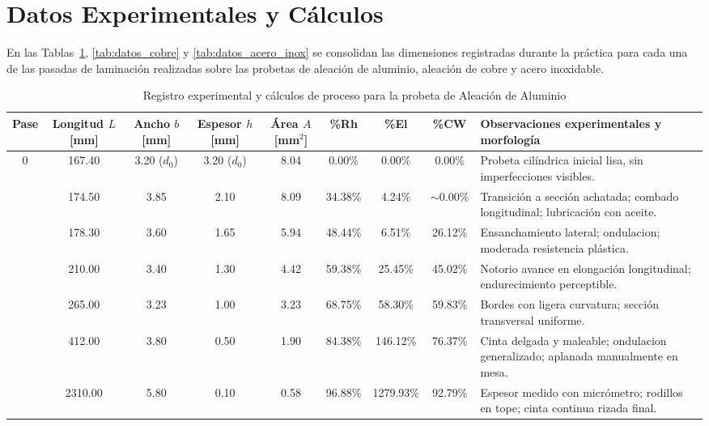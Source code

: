 \documentclass[journal]{IEEEtran}
\begin{document}
\section{Datos Experimentales y Cálculos}
En las Tablas~\ref{tab:datos_aluminio}, \ref{tab:datos_cobre} y \ref{tab:datos_acero_inox} se consolidan las dimensiones registradas durante la práctica para cada una de las pasadas de laminación realizadas sobre las probetas de aleación de aluminio, aleación de cobre y acero inoxidable.

\begin{table}[t]
\centering
\caption{Registro experimental y cálculos de proceso para la probeta de Aleación de Aluminio}
\label{tab:datos_aluminio}
\footnotesize
\setlength{\tabcolsep}{3.5pt}
\renewcommand{\arraystretch}{1.15}
\begin{tabularx}{\textwidth}{c c c c c c c c >{\raggedright\arraybackslash}X}
\toprule
\textbf{Pase} & \makecell{\textbf{Longitud}\\\textbf{$L$ [mm]}} & \makecell{\textbf{Ancho}\\\textbf{$b$ [mm]}} & \makecell{\textbf{Espesor}\\\textbf{$h$ [mm]}} & \makecell{\textbf{Área}\\\textbf{$A$ [mm$^2$]}} & \textbf{\%Rh} & \textbf{\%El} & \textbf{\%CW} & \textbf{Observaciones experimentales y morfología} \\
\midrule
0 & 167.40 & 3.20 ($d_0$) & 3.20 ($d_0$) & 8.04 & 0.00\% & 0.00\% & 0.00\% & Probeta cilíndrica inicial lisa, sin imperfecciones visibles. \\ \addlinespace[3.5pt]
1 & 174.50 & 3.85 & 2.10 & 8.09 & 34.38\% & 4.24\% & $\sim 0.00\%$ & Transición a sección achatada; combado longitudinal; lubricación con aceite. \\ \addlinespace[3.5pt]
2 & 178.30 & 3.60 & 1.65 & 5.94 & 48.44\% & 6.51\% & 26.12\% & Ensanchamiento lateral; ondulacion; moderada resistencia plástica. \\ \addlinespace[3.5pt]
3 & 210.00 & 3.40 & 1.30 & 4.42 & 59.38\% & 25.45\% & 45.02\% & Notorio avance en elongación longitudinal; endurecimiento perceptible. \\ \addlinespace[3.5pt]
4 & 265.00 & 3.23 & 1.00 & 3.23 & 68.75\% & 58.30\% & 59.83\% & Bordes con ligera curvatura; sección transversal uniforme. \\ \addlinespace[3.5pt]
5 & 412.00 & 3.80 & 0.50 & 1.90 & 84.38\% & 146.12\% & 76.37\% & Cinta delgada y maleable; ondulacion generalizado; aplanada manualmente en mesa. \\ \addlinespace[3.5pt]
6 & 2310.00 & 5.80 & 0.10 & 0.58 & 96.88\% & 1279.93\% & 92.79\% & Espesor medido con micrómetro; rodillos en tope; cinta continua rizada final. \\
\bottomrule
\end{tabularx}
\end{table}
\end{document}
